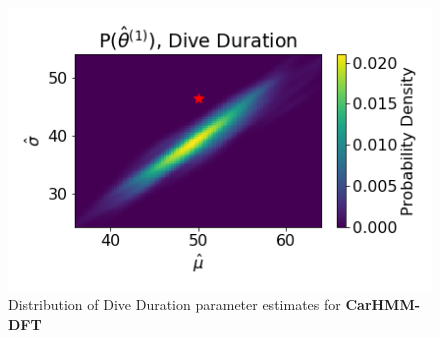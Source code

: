 \documentclass[12pt]{TD-CJS}
\begin{document}
\begin{figure}
    \centering
    \includegraphics[width=5in]{../Plots/hmm_FV_MLE_density_dive_duration_-1_0.png}
    \caption{Distribution of Dive Duration parameter estimates for \textbf{CarHMM-DFT}}
\end{figure}
\end{document}

